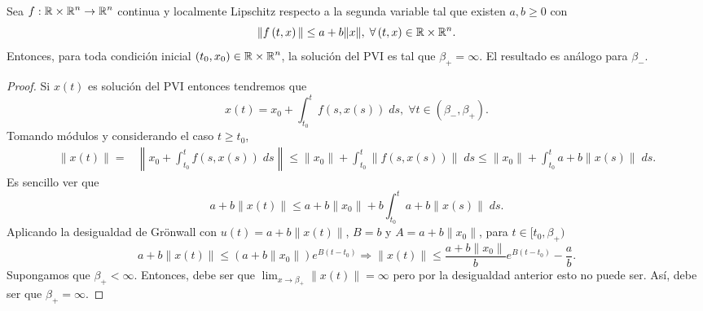 \begin{prop}
Sea $\displaystyle f : \mathbb{R} \times \mathbb{R}^{n} \to \mathbb{R}^{n} $ continua y localmente Lipschitz respecto a la segunda variable tal que existen $\displaystyle a, b \geq 0 $ con
\[ \|f\left(t,x\right)\| \leq a + b \|x\|,  \; \forall \left(t,x\right)\in \mathbb{R} \times \mathbb{R}^{n} .\]
Entonces, para toda condición inicial $\displaystyle \left(t_{0}, x_{0}\right)\in \mathbb{R} \times \mathbb{R}^{n} $, la solución del PVI es tal que $\displaystyle \beta_{+ }= \infty $. El resultado es análogo para $\displaystyle \beta_{-} $. 
\end{prop}
\begin{proof}
Si $\displaystyle x\left(t\right) $ es solución del PVI entonces tendremos que 
\[x\left(t\right)=x_{0} + \int^{t}_{t_{0}} f\left(s, x\left(s\right)\right) \; d s, \; \forall t \in \left(\beta_{- }, \beta_{+ }\right) .\]
Tomando módulos y considerando el caso $\displaystyle t \geq t_{0} $,
\[
\begin{split}
	\|x\left(t\right)\| = & \left\|x_{0} +\int^{t}_{t_{0}} f\left(s, x\left(s\right)\right) \; d s\right\|\leq \|x_{0}\| + \int^{t}_{t_{0}} \|f\left(s, x\left(s\right)\right)\| \; d s 
	\leq  \|x_{0}\| + \int^{t}_{t_{0}} a + b \|x\left(s\right)\| \; d s .
\end{split}
\]
Es sencillo ver que 
\[a + b\|x\left(t\right)\| \leq a + b\|x_{0}\| + b \int^{t}_{t_{0}} a + b \|x\left(s\right)\| \; d s  .\]
Aplicando la desigualdad de Grönwall con $\displaystyle u\left(t\right)=a + b \|x\left(t\right)\| $, $\displaystyle B = b $ y $\displaystyle A = a + b\|x_{0}\| $, para $\displaystyle t \in [t_{0}, \beta_{+ }) $
\[a + b\|x\left(t\right)\| \leq \left(a + b \|x_{0}\|\right)e^{B\left(t-t_{0}\right)} \Rightarrow \|x\left(t\right)\| \leq \frac{a+b\|x_{0}\|}{b}e^{B\left(t-t_{0}\right)}-\frac{a}{b} .\]
Supongamos que $\displaystyle \beta_{+}<\infty $. Entonces, debe ser que $\displaystyle \lim_{x \to \beta_{+ }}\|x\left(t\right)\| =\infty $ pero por la desigualdad anterior esto no puede ser. Así, debe ser que $\displaystyle \beta_{+ }=\infty  $. 
\end{proof}

